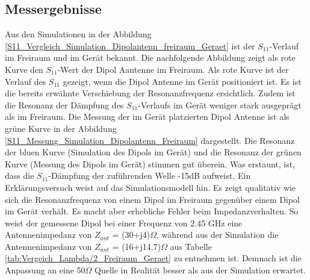 \subsection{Messergebnisse}
\label{sec:Messergebinsse}
Aus den Simulationen in der Abbildung \ref{S11_Vergleich_Simulation_Dipolantenn_freiraum_Geraet} ist der $S_{11}$-Verlauf im Freiraum und im Gerät bekannt. Die nachfolgende Abbildung zeigt als rote Kurve den $S_{11}$-Wert der Dipol Aantenne im Freiraum. Als rote Kurve ist der Verlauf des $S_{11}$ gezeigt, wenn die Dipol Antenne im Gerät positioniert ist. Es ist die bereits erwähnte Verschiebung der Resonanzfrequenz ersichtlich. Zudem ist die Resonanz der Dämpfung des $S_{11}$-Verlaufs im Gerät weniger stark ausgeprägt als im Freiraum. Die Messung der im Gerät platzierten Dipol Antenne ist als grüne Kurve in der Abbildung \ref{S11_Messung_Simulation_Dipolantenn_Freiraum} dargestellt. Die Resonanz der bluen Kurve (Simulation des Dipols im Gerät) und die Resonanz der grünen Kurve (Messung des Dipols im Gerät) stimmen gut überein. Was erstaunt, ist, dass die $S_{11}$-Dämpfung der zuführenden Welle -15dB aufweist. Ein Erklärungsversuch weist auf das Simulationsmodell hin. Es zeigt qualitativ  wie sich die Resonanzfrequenz von einem Dipol im Freiraum gegenüber einem Dipol im Gerät verhält. Es macht aber erhebliche Fehler beim Impedanzverhalten. So weist der gemessene Dipol bei einer Frequenz von 2.45 GHz eine Antennenimpedanz von $Z_{ant}$ = (30+j4)$\Omega$, während aus der Simulation die Antennenimpedanz von $Z_{ant}$ = (16+j14.7)$\Omega$ aus Tabelle \ref{tab:Vergeich_Lambda/2_Freiraum_Geraet} zu entnehmen ist. Demnach ist die Anpassung  an eine 50$\Omega$ Quelle in Realität besser als aus der Simulation erwartet.


%	

